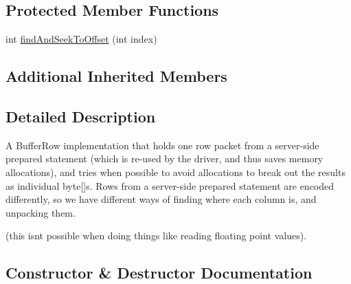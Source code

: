 \subsection*{Protected Member Functions}
\begin{DoxyCompactItemize}
\item 
int \mbox{\hyperlink{classcom_1_1mysql_1_1cj_1_1protocol_1_1a_1_1result_1_1_binary_buffer_row_a5b8c0028ba6d68556a027d0d6cdf96aa}{find\+And\+Seek\+To\+Offset}} (int index)
\end{DoxyCompactItemize}
\subsection*{Additional Inherited Members}


\subsection{Detailed Description}
A Buffer\+Row implementation that holds one row packet from a server-\/side prepared statement (which is re-\/used by the driver, and thus saves memory allocations), and tries when possible to avoid allocations to break out the results as individual byte\mbox{[}\mbox{]}s. Rows from a server-\/side prepared statement are encoded differently, so we have different ways of finding where each column is, and unpacking them.

(this isn\textquotesingle{}t possible when doing things like reading floating point values). 

\subsection{Constructor \& Destructor Documentation}
\mbox{\label{classcom_1_1mysql_1_1cj_1_1protocol_1_1a_1_1result_1_1_binary_buffer_row_aad91e14d0208a114059292a386693301}} 
